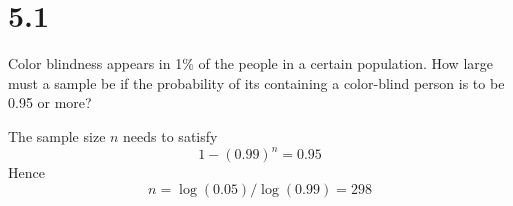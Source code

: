 \section*{5.1}
Color blindness appears in 1\% of the people in a certain
population.
How large must a sample be if the probability of its containing a
color-blind person is to be 0.95 or more?

\bigskip
\noindent
The sample size $n$ needs to satisfy
$$1-(0.99)^n=0.95$$
Hence
$$n=\log(0.05)/\log(0.99)=298$$

